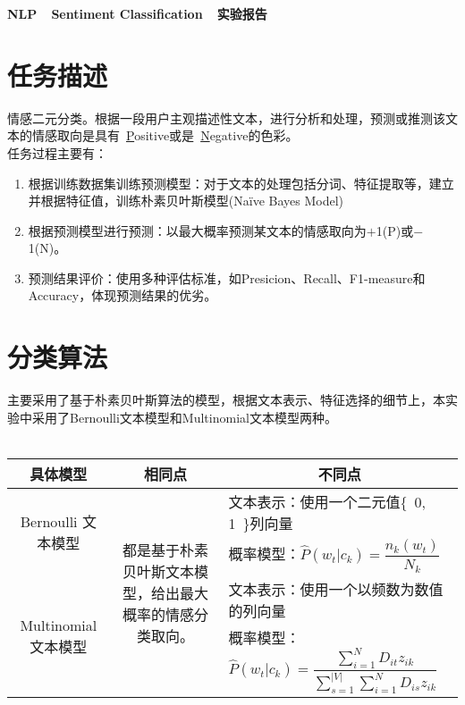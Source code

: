\documentclass[11pt]{article}
\begin{document}
\begin{flushleft}
{\Huge{\textbf{NLP\ \ Sentiment Classification\ \ 实验报告}}}\\
\end{flushleft}
\section{任务描述}
\hspace{1.6em} 情感二元分类。根据一段用户主观描述性文本，进行分析和处理，预测或推测该文本的情感取向是具有~\underline{P}ositive或是~\underline{N}egative的色彩。\\
\indent 任务过程主要有：
\begin{enumerate}
  \item 根据训练数据集训练预测模型：对于文本的处理包括分词、特征提取等，建立并根据特征值，训练朴素贝叶斯模型(Naïve Bayes Model)
  \item 根据预测模型进行预测：以最大概率预测某文本的情感取向为$+$1(P)或$-$1(N)。
  \item 预测结果评价：使用多种评估标准，如Presicion、Recall、F1-measure和Accuracy，体现预测结果的优劣。
\end{enumerate}
\section{分类算法}
\hspace{1.6em} 主要采用了基于朴素贝叶斯算法的模型，根据文本表示、特征选择的细节上，本实验中采用了Bernoulli文本模型和Multinomial文本模型两种。\\
\\
\begin{tabular}{|c|c|p{8cm}|}
\hline
具体模型 & 相同点 & \multicolumn{1}{c|}{不同点} \\
\hline
\multirow{3}{*}{Bernoulli 文本模型}& \multirow{6}{3cm}{都是基于朴素贝叶斯文本模型，给出最大概率的情感分类取向。}& 文本表示：使用一个二元值\{\ 0, 1\ \}列向量\\ \cline{3-3}
& & \multirow{2}{*}{概率模型：$\hat{P}(w_t|c_k)=\dfrac{n_k(w_t)}{N_k}$}\\
 & & \\ \cline{1-1} \cline{3-3}
\multirow{3}{*}{Multinomial 文本模型}& & 文本表示：使用一个以频数为数值的列向量 \\ \cline{3-3}
& & \multirow{2}{*}{概率模型：$\hat{P}(w_t|c_k)=\dfrac{\sum_{i=1}^{N}D_{it}z_{ik}}{\sum_{s=1}^{|V|}\sum_{i=1}^{N}D_{is}z_{ik}}$}\\
& & \\
\hline
\end{tabular}
\end{document}
